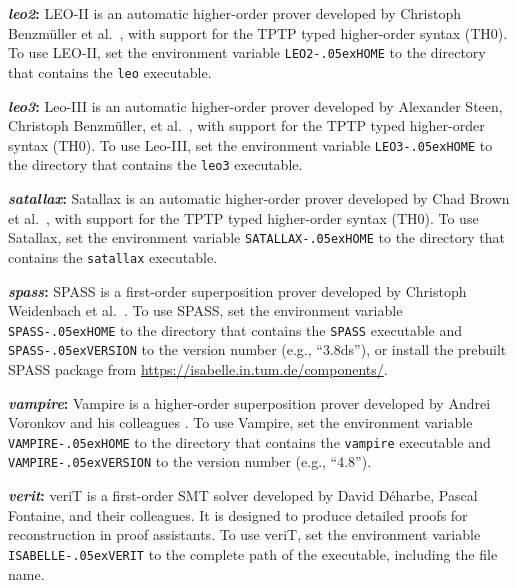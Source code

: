 \documentclass[a4paper,12pt]{article}
\newcommand\download{\url{https://isabelle.in.tum.de/components/}}
\renewcommand\_{\hbox{\textunderscore\kern-.05ex}}
\begin{document}
\begin{enum}
\begin{sloppy}
\begin{enum}
\item[\labelitemi] \textbf{\textit{leo2}:} LEO-II is an automatic
higher-order prover developed by Christoph Benzm\"uller et al.\ \cite{leo2},
with support for the TPTP typed higher-order syntax (TH0). To use LEO-II, set
the environment variable \texttt{LEO2\_HOME} to the directory that contains the
\texttt{leo} executable.

\item[\labelitemi] \textbf{\textit{leo3}:} Leo-III is an automatic
higher-order prover developed by Alexander Steen, Christoph Benzm\"uller,
et al.\ \cite{leo3},
with support for the TPTP typed higher-order syntax (TH0). To use Leo-III, set
the environment variable \texttt{LEO3\_HOME} to the directory that contains the
\texttt{leo3} executable.

\item[\labelitemi] \textbf{\textit{satallax}:} Satallax is an automatic
higher-order prover developed by Chad Brown et al.\ \cite{satallax}, with
support for the TPTP typed higher-order syntax (TH0). To use Satallax, set the
environment variable \texttt{SATALLAX\_HOME} to the directory that contains the
\texttt{satallax} executable.

\item[\labelitemi] \textbf{\textit{spass}:} SPASS is a first-order superposition
prover developed by Christoph Weidenbach et al.\ \cite{weidenbach-et-al-2009}.
To use SPASS, set the environment variable \texttt{SPASS\_HOME} to the directory
that contains the \texttt{SPASS} executable and \texttt{SPASS\_VERSION} to the
version number (e.g., ``3.8ds''), or install the prebuilt SPASS package from
\download.

\item[\labelitemi] \textbf{\textit{vampire}:} Vampire is a higher-order
superposition prover developed by Andrei Voronkov and his colleagues
\cite{riazanov-voronkov-2002}. To use Vampire, set the environment variable
\texttt{VAMPIRE\_HOME} to the directory that contains the \texttt{vampire}
executable and \texttt{VAMPIRE\_VERSION} to the version number (e.g.,
``4.8'').

\item[\labelitemi] \textbf{\textit{verit}:} veriT \cite{bouton-et-al-2009} is a
first-order SMT solver developed by David D\'eharbe, Pascal Fontaine, and their
colleagues. It is designed to produce detailed proofs for reconstruction in
proof assistants. To use veriT, set the environment variable
\texttt{ISABELLE\_VERIT} to the complete path of the executable, including the
file name.


\end{enum}
\end{sloppy}
\end{enum}
\end{document}
